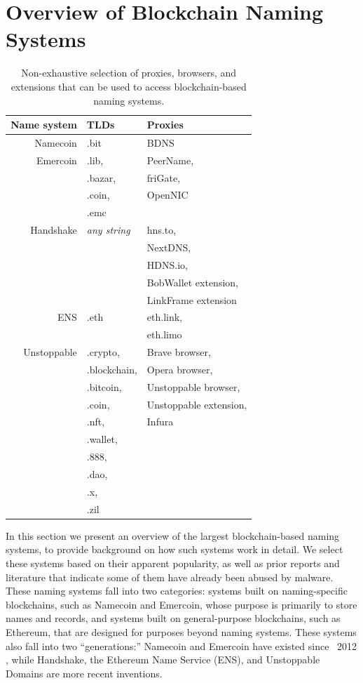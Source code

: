 \section{Overview of Blockchain Naming Systems}

\begin{table}
	\begin{tabular}{r l l}
		\toprule
		Name system & TLDs & Proxies \\
		\midrule
		Namecoin & .bit & BDNS \\
		Emercoin & .lib, & PeerName,  \\
		& .bazar, & friGate, \\
		& .coin, & OpenNIC \\
		& .emc & \\
		Handshake & \emph{any string} & hns.to, \\
		& & NextDNS, \\
		& & HDNS.io,\\
		& & BobWallet extension, \\
		& & LinkFrame extension \\
		ENS & .eth & eth.link, \\
		& & eth.limo \\
		Unstoppable & .crypto, & Brave browser, \\
		& .blockchain, & Opera browser, \\
		& .bitcoin, & Unstoppable browser, \\
		& .coin, & Unstoppable extension, \\
		& .nft, & Infura\\
		& .wallet, & \\
		& .888, & \\
		& .dao, & \\
		& .x, & \\
		& .zil & \\
		\bottomrule
	\end{tabular}
	\caption{Non-exhaustive selection of proxies, browsers, 
		and extensions 
		that can be used to access blockchain-based naming 
		systems. }
	\label{tab:proxies_and_tlds}
\end{table}

In this section we present an overview of the largest blockchain-based naming 
systems, to provide background on how such systems work in detail. We select 
these systems based on their apparent popularity, as well as 
prior reports and literature that indicate some of them have already been 
abused by malware. These naming systems fall into two categories: systems built 
on naming-specific blockchains, such as Namecoin and Emercoin, whose purpose is 
primarily to store names and records, and systems built on general-purpose 
blockchains, such as Ethereum, that are designed for purposes beyond naming 
systems. These systems also fall into two ``generations:'' Namecoin and 
Emercoin have existed since ~2012 , while 
Handshake, the Ethereum Name Service (ENS), and Unstoppable Domains are more 
recent inventions. 

